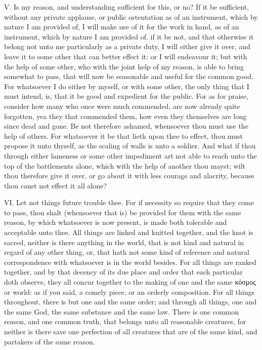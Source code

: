 V. Is my reason, and understanding sufficient for this, or no? If it be
sufficient, without any private applause, or public ostentation as of an
instrument, which by nature I am provided of, I will make use of it for
the work in hand, as of an instrument, which by nature I am provided of.
if it be not, and that otherwise it belong not unto me particularly as a
private duty, I will either give it over, and leave it to some other that
can better effect it: or I will endeavour it; but with the help of some
other, who with the joint help of my reason, is able to bring somewhat to
pass, that will now be seasonable and useful for the common good. For
whatsoever I do either by myself, or with some other, the only thing that
I must intend, is, that it be good and expedient for the public. For as
for praise, consider how many who once were much commended, are now
already quite forgotten, yea they that commended them, how even they
themselves are long since dead and gone. Be not therefore ashamed,
whensoever thou must use the help of others. For whatsoever it be that
lieth upon thee to effect, thou must propose it unto thyself, as the
scaling of walls is unto a soldier. And what if thou through either
lameness or some other impediment art not able to reach unto the top of
the battlements alone, which with the help of another thou mayst; wilt
thou therefore give it over, or go about it with less courage and
alacrity, because thou canst not effect it all alone?

VI. Let not things future trouble thee. For if necessity so require that
they come to pass, thou shalt (whensoever that is) be provided for them
with the same reason, by which whatsoever is now present, is made both
tolerable and acceptable unto thee. All things are linked and knitted
together, and the knot is sacred, neither is there anything in the world,
that is not kind and natural in regard of any other thing, or, that hath
not some kind of reference and natural correspondence with whatsoever is
in the world besides. For all things are ranked together, and by that
decency of its due place and order that each particular doth observe,
they all concur together to the making of one and the same
κόσμος or world: as if you said, a comely
piece, or an orderly composition. For all things throughout, there is but
one and the same order; and through all things, one and the same God, the
same substance and the same law. There is one common reason, and one
common truth, that belongs unto all reasonable creatures, for neither is
there save one perfection of all creatures that are of the same kind, and
partakers of the same reason.

